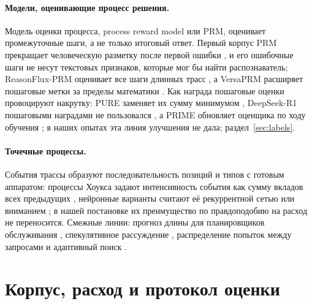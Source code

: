 \documentclass[11pt]{article}
\begin{document}
\paragraph{Модели, оценивающие процесс решения.} Модель оценки процесса, process reward model или PRM, оценивает промежуточные шаги, а не только итоговый ответ. Первый корпус PRM прекращает человеческую разметку после первой ошибки \citep{lightman2024verify}, и его ошибочные шаги не несут текстовых признаков, которые мог бы найти распознаватель; ReasonFlux-PRM оценивает все шаги длинных трасс \citep{zou2025reasonflux}, а VersaPRM расширяет пошаговые метки за пределы математики \citep{zeng2025versaprm}. Как награда пошаговые оценки провоцируют накрутку: PURE заменяет их сумму минимумом \citep{cheng2025pure}, DeepSeek-R1 пошаговыми наградами не пользовался \citep{deepseekr1}, а PRIME обновляет оценщика по ходу обучения \citep{cui2025prime}; в наших опытах эта линия улучшения не дала; раздел~\ref{sec:labels}.

\paragraph{Точечные процессы.} События трассы образуют последовательность позиций и типов с готовым аппаратом: процессы Хоукса задают интенсивность события как сумму вкладов всех предыдущих \citep{hawkes1971,hawkes1974cluster}, нейронные варианты считают её рекуррентной сетью или вниманием \citep{du2016rmtpp,mei2017neuralhawkes,zuo2020thp}; в нашей постановке их преимущество по правдоподобию на расход не переносится. Смежные линии: прогноз длины для планировщиков обслуживания \citep{zheng2023response}, спекулятивное рассуждение \citep{pan2025specreason}, распределение попыток между запросами \citep{fu2024certaindex} и адаптивный поиск \citep{jeong2024adaptiverag}.

\section{Корпус, расход и протокол оценки}
\label{sec:traces}
\end{document}
